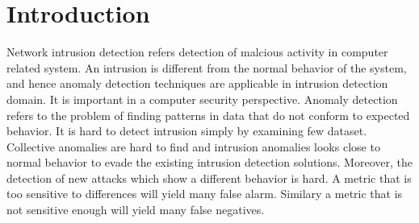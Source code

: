 \section{Introduction}
Network intrusion detection refers detection of malcious activity in computer related system. 
An intrusion is different from the normal behavior of the system, and hence anomaly detection techniques are applicable in intrusion detection domain. \cite{chandola09}
It is important in a computer security perspective. Anomaly detection refers to the problem of finding patterns in data that do not conform to expected behavior\cite{chandola09}. 
It is hard to detect intrusion simply by examining few dataset. 
Collective anomalies are hard to find and intrusion anomalies looks close to normal behavior to evade the existing intrusion detection solutions\cite{chandola09}. 
Moreover, the detection of new attacks which show a different behavior is hard. 
A metric that is too sensitive to differences will yield many false alarm. Similary a metric that is not sensitive enough will yield many false negatives.

